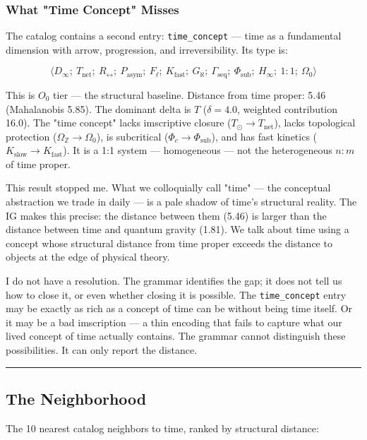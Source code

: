 \documentclass[12pt,a4paper]{article}
\begin{document}
\subsubsection{What "Time Concept" Misses}

The catalog contains a second entry: \texttt{time\_concept} --- time as a fundamental dimension with arrow, progression, and irreversibility. Its type is:

\[\langle D_{\infty};\ T_\text{net};\ R_{\leftrightarrow};\ P_\text{asym};\ F_{\ell};\ K_\text{fast};\ G_{\aleph};\ \Gamma_\text{seq};\ \Phi_\text{sub};\ H_{\infty};\ 1{:}1;\ \Omega_0 \rangle\]

This is $O_0$ tier --- the structural baseline. Distance from time proper: 5.46 (Mahalanobis 5.85). The dominant delta is $T$ ($\delta = 4.0$, weighted contribution 16.0). The "time concept" lacks imscriptive closure ($T_{\odot} \to T_\text{net}$), lacks topological protection ($\Omega_\mathbb{Z} \to \Omega_0$), is subcritical ($\Phi_c \to \Phi_\text{sub}$), and has fast kinetics ($K_\text{slow} \to K_\text{fast}$). It is a 1:1 system --- homogeneous --- not the heterogeneous $n{:}m$ of time proper.

This result stopped me. What we colloquially call "time" --- the conceptual abstraction we trade in daily --- is a pale shadow of time's structural reality. The IG makes this precise: the distance between them (5.46) is larger than the distance between time and quantum gravity (1.81). We talk about time using a concept whose structural distance from time proper exceeds the distance to objects at the edge of physical theory.

I do not have a resolution. The grammar identifies the gap; it does not tell us how to close it, or even whether closing it is possible. The \texttt{time\_concept} entry may be exactly as rich as a concept of time can be without being time itself. Or it may be a bad imscription --- a thin encoding that fails to capture what our lived concept of time actually contains. The grammar cannot distinguish these possibilities. It can only report the distance.

\begin{center}
\rule{0.5\textwidth}{0.4pt}
\end{center}

\subsection{The Neighborhood}

The 10 nearest catalog neighbors to time, ranked by structural distance:
\end{document}
